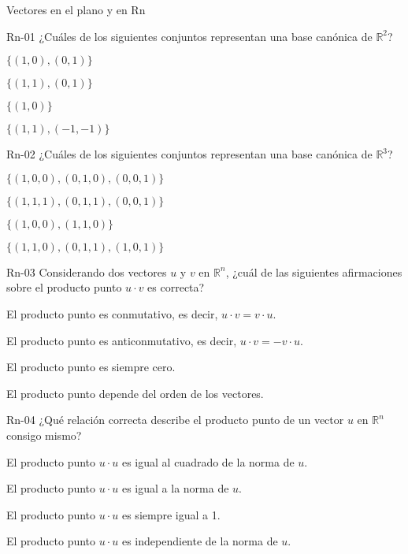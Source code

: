 \documentclass[a4,11pt]{aleph-notas}
\begin{document}
\begin{quiz}{Vectores en el plano y en Rn}

\begin{multi}[]%
    {Rn-01}
    ¿Cuáles de los siguientes conjuntos representan una base canónica de \( \mathbb{R}^2 \)?
    \item* $\{ (1,0), (0,1) \}$
    \item $\{ (1,1), (0,1) \}$
    \item $\{ (1,0) \}$
    \item $\{ (1,1), (-1,-1) \}$
\end{multi}

\begin{multi}[]%
    {Rn-02}
    ¿Cuáles de los siguientes conjuntos representan una base canónica de \( \mathbb{R}^3 \)?
    \item* $\{ (1,0,0), (0,1,0), (0,0,1) \}$
    \item $\{ (1,1,1), (0,1,1), (0,0,1) \}$
    \item $\{ (1,0,0), (1,1,0) \}$
    \item $\{ (1,1,0), (0,1,1), (1,0,1) \}$
\end{multi}

\begin{multi}[]%
    {Rn-03}
    Considerando dos vectores \( u \) y \( v \) en \( \mathbb{R}^n \), ¿cuál de las siguientes afirmaciones sobre el producto punto \( u \cdot v \) es correcta?
    \item* El producto punto es conmutativo, es decir, \( u \cdot v = v \cdot u \).
    \item El producto punto es anticonmutativo, es decir, \( u \cdot v = -v \cdot u \).
    \item El producto punto es siempre cero.
    \item El producto punto depende del orden de los vectores.
\end{multi}

\begin{multi}[]%
    {Rn-04}
    ¿Qué relación correcta describe el producto punto de un vector \( u \) en \( \mathbb{R}^n \) consigo mismo?
    \item* El producto punto \( u \cdot u \) es igual al cuadrado de la norma de \( u \).
    \item El producto punto \( u \cdot u \) es igual a la norma de \( u \).
    \item El producto punto \( u \cdot u \) es siempre igual a 1.
    \item El producto punto \( u \cdot u \) es independiente de la norma de \( u \).
\end{multi}


\end{quiz}
\end{document}
